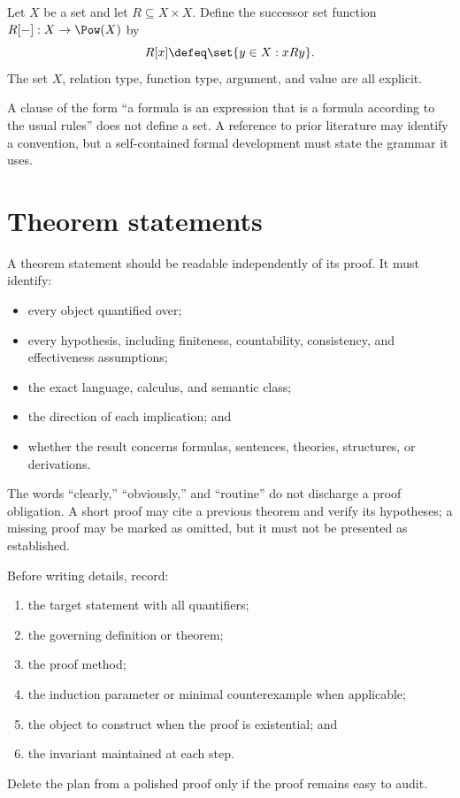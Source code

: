 \begin{example}
Let \(X\) be a set and let \(R\subseteq X\times X\).  Define the successor set
function \(R[-]:X\to\Pow(X)\) by
\[
  R[x]\defeq\set{y\in X:xRy}.
\]
The set \(X\), relation type, function type, argument, and value are all
explicit.
\end{example}

\begin{warning}
A clause of the form ``a formula is an expression that is a formula according
to the usual rules'' does not define a set.  A reference to prior literature
may identify a convention, but a self-contained formal development must state
the grammar it uses.
\end{warning}

\section{Theorem statements}
\label{sec:writing-foundations-03}

A theorem statement should be readable independently of its proof.  It must
identify:
\begin{itemize}
  \item every object quantified over;
  \item every hypothesis, including finiteness, countability, consistency, and
        effectiveness assumptions;
  \item the exact language, calculus, and semantic class;
  \item the direction of each implication; and
  \item whether the result concerns formulas, sentences, theories, structures,
        or derivations.
\end{itemize}

The words ``clearly,'' ``obviously,'' and ``routine'' do not discharge a proof
obligation.  A short proof may cite a previous theorem and verify its
hypotheses; a missing proof may be marked as omitted, but it must not be
presented as established.

\begin{method}
Before writing details, record:
\begin{enumerate}
  \item the target statement with all quantifiers;
  \item the governing definition or theorem;
  \item the proof method;
  \item the induction parameter or minimal counterexample when applicable;
  \item the object to construct when the proof is existential; and
  \item the invariant maintained at each step.
\end{enumerate}
Delete the plan from a polished proof only if the proof remains easy to audit.
\end{method}

